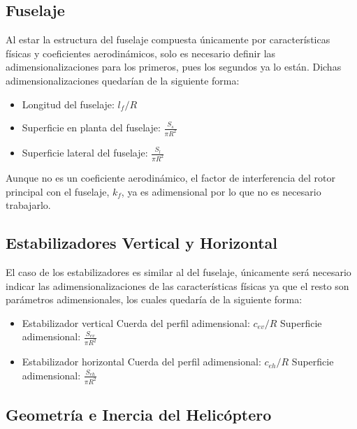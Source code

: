\subsection{Fuselaje}

Al estar la estructura del fuselaje compuesta únicamente por características físicas y coeficientes aerodinámicos, solo es necesario definir las adimensionalizaciones para los primeros, pues los segundos ya lo están. Dichas adimensionalizaciones quedarían de la siguiente forma:

\singlespacing
\begin{multicols}{2}
	\begin{itemize}
		\item Longitud del fuselaje: $l_f/R$
		\item Superficie en planta del fuselaje: $\frac{S_s}{\pi R^2}$
		\item Superficie lateral del fuselaje: $\frac{S_l}{\pi R^2}$
	\end{itemize}
\end{multicols}

Aunque no es un coeficiente aerodinámico, el factor de interferencia del rotor principal con el fuselaje, $k_f$, ya es adimensional por lo que no es necesario trabajarlo.

\subsection{Estabilizadores Vertical y Horizontal}

El caso de los estabilizadores es similar al del fuselaje, únicamente será necesario indicar las adimensionalizaciones de las características físicas ya que el resto son parámetros adimensionales, los cuales quedaría de la siguiente forma:

\singlespacing
\begin{multicols}{2}
	\begin{itemize}
		\item Estabilizador vertical
		\subitem Cuerda del perfil adimensional: $c_{ev}/R$
		\subitem Superficie adimensional: $\frac{S_{ev}}{\pi R^2}$
		\item Estabilizador horizontal
		\subitem Cuerda del perfil adimensional: $c_{eh}/R$
		\subitem Superficie adimensional: $\frac{S_{eh}}{\pi R^2}$
	\end{itemize}
\end{multicols}

\subsection{Geometría e Inercia del Helicóptero}

